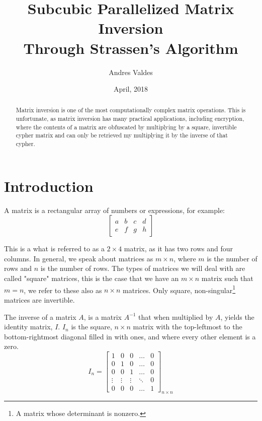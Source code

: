 \documentclass[12pt, letterpaper]{article}
\title{Subcubic Parallelized Matrix Inversion \\
	\large Through Strassen's Algorithm}
\author{Andres Valdes}
\date{April, 2018}
\theoremstyle{remark}
\theoremstyle{remark}
\begin{document}
    \begin{titlepage}
        \maketitle
        \thispagestyle{empty}

    \end{titlepage}

    \begin{abstract}
        
        Matrix inversion is one of the most computationally complex 
        matrix operations. This is unfortunate, as matrix inversion 
        has many practical applications, including encryption, where the 
        contents of a matrix are obfuscated by multiplying by a square,
        invertible cypher matrix and can only be retrieved my multiplying
        it by the inverse of that cypher.

    \end{abstract}

    \pagebreak

    \section{Introduction}

    \noindent 
    A matrix is a rectangular array of numbers or expressions, for example: 
    \[\begin{bmatrix*}
        a & b & c & d \\
        e & f & g & h
    \end{bmatrix*}\]

    This is a what is referred to as a \(2\times{4}\) matrix, as it 
    has two rows and four columns. In general, we speak about matrices as 
    \(m\times{n}\), where \(m\) is the number of rows and \(n\) is the number 
    of rows. The types of matrices we will deal with are called "square" 
    matrices, this is the case that we have an \(m\times{n}\) matrix such that 
    \(m = n\), we refer to these also as \(n\times{n}\) matrices. Only square, 
    non-singular\footnote{A matrix whose determinant is nonzero.} 
    matrices are invertible.

    The inverse of a matrix \(A\), is a matrix \(A^{-1}\) that when multiplied by \(A\), 
    yields the identity matrix, \(I\). \(I_n\) is the square, \(n\times{n}\) 
    matrix with the top-leftmost to the bottom-rightmost diagonal filled in 
    with ones, and where every other element is a zero.
    \[I_n = \begin{bmatrix*}
        1 & 0 & 0 & \dots & 0 \\
        0 & 1 & 0 & \dots & 0 \\
        0 & 0 & 1 & \dots & 0 \\
        \vdots & \vdots & \vdots & \ddots & 0 \\
        0 & 0 & 0 & \dots & 1
    \end{bmatrix*}_{n\times n}\]
\end{document}
